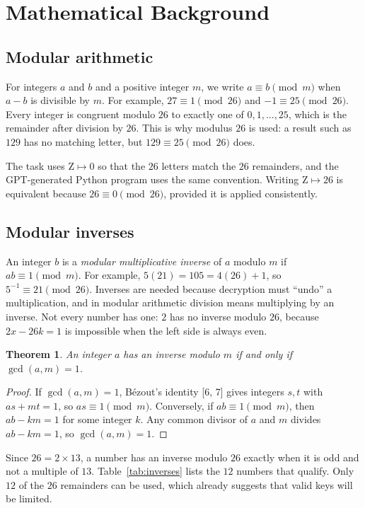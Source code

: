 \documentclass[11pt,a4paper]{article}
\theoremstyle{plain}
\newtheorem{theorem}{Theorem}
\theoremstyle{definition}
\begin{document}
\section{Mathematical Background}

\subsection{Modular arithmetic}

For integers $a$ and $b$ and a positive integer $m$, we write $a\equiv b\pmod m$ when $a-b$ is divisible by $m$. For example, $27\equiv1\pmod{26}$ and $-1\equiv25\pmod{26}$. Every integer is congruent modulo $26$ to exactly one of $0,1,\ldots,25$, which is the remainder after division by $26$. This is why modulus $26$ is used: a result such as $129$ has no matching letter, but $129\equiv25\pmod{26}$ does.

The task uses $\text{Z}\mapsto0$ so that the $26$ letters match the $26$ remainders, and the GPT-generated Python program uses the same convention. Writing $\text{Z}\mapsto26$ is equivalent because $26\equiv0\pmod{26}$, provided it is applied consistently.

\subsection{Modular inverses}

An integer $b$ is a \emph{modular multiplicative inverse} of $a$ modulo $m$ if $ab\equiv1\pmod m$. For example, $5(21)=105=4(26)+1$, so $5^{-1}\equiv21\pmod{26}$. Inverses are needed because decryption must ``undo'' a multiplication, and in modular arithmetic division means multiplying by an inverse. Not every number has one: $2$ has no inverse modulo $26$, because $2x-26k=1$ is impossible when the left side is always even.

\begin{theorem}\label{thm:inverse}
An integer $a$ has an inverse modulo $m$ if and only if $\gcd(a,m)=1$.
\end{theorem}
\begin{proof}
If $\gcd(a,m)=1$, Bézout's identity [6, 7] gives integers $s,t$ with $as+mt=1$, so $as\equiv1\pmod m$. Conversely, if $ab\equiv1\pmod m$, then $ab-km=1$ for some integer $k$. Any common divisor of $a$ and $m$ divides $ab-km=1$, so $\gcd(a,m)=1$.
\end{proof}

Since $26=2\times13$, a number has an inverse modulo $26$ exactly when it is odd and not a multiple of $13$. Table~\ref{tab:inverses} lists the $12$ numbers that qualify. Only $12$ of the $26$ remainders can be used, which already suggests that valid keys will be limited.
\end{document}
